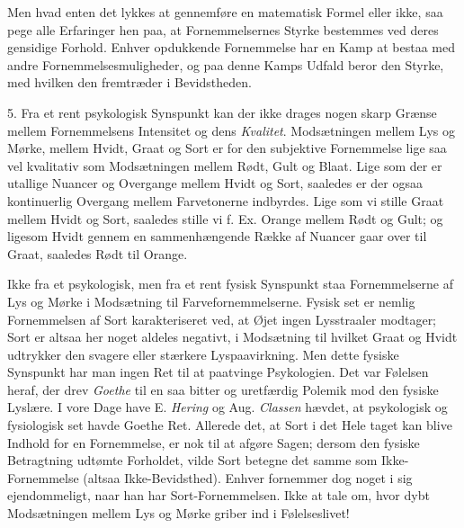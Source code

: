 \documentclass[12pt,a4paper,openany]{book}
\newcommand{\opage}[1]{\marginnote{\footnotesize\textit{[#1]}}}
\begin{document}
Men hvad enten det lykkes at gennemføre en matematisk Formel eller ikke,
saa pege alle Erfaringer hen paa, at Fornemmelsernes Styrke bestemmes
ved deres gensidige Forhold. Enhver opdukkende Fornemmelse har en Kamp
at bestaa med andre Fornemmelsesmuligheder, og paa denne Kamps Udfald
beror den Styrke, med hvilken den fremtræder i Bevidstheden.

5. Fra et rent psykologisk Synspunkt kan der ikke drages nogen skarp
Grænse mellem Fornemmelsens Intensitet og dens \emph{Kvalitet}.
Modsætningen mellem Lys og Mørke, mellem Hvidt, Graat og Sort er for den
subjektive Fornemmelse lige saa vel kvalitativ som Modsætningen mellem
Rødt, Gult og Blaat. Lige som der er utallige Nuancer og Overgange
mellem Hvidt og Sort, saaledes er der ogsaa kontinuerlig Overgang mellem
Farvetonerne indbyrdes. Lige som vi stille Graat mellem Hvidt og Sort,
saaledes stille vi f. Ex. Orange mellem Rødt og Gult; og ligesom Hvidt
gennem en sammenhængende Række af Nuancer gaar over til Graat, saaledes
Rødt til Orange.


\opage{135}Ikke fra et psykologisk, men fra et rent fysisk Synspunkt
staa Fornemmelserne af Lys og Mørke i Modsætning til
Farvefornemmelserne. Fysisk set er nemlig Fornemmelsen af Sort
karakteriseret ved, at Øjet ingen Lysstraaler modtager; Sort er altsaa
her noget aldeles negativt, i Modsætning til hvilket Graat og Hvidt
udtrykker den svagere eller stærkere Lyspaavirkning. Men dette fysiske
Synspunkt har man ingen Ret til at paatvinge Psykologien. Det var
Følelsen heraf, der drev \emph{Goethe} til en saa bitter og uretfærdig
Polemik mod den fysiske Lyslære. I vore Dage have E. \emph{Hering} og
Aug. \emph{Classen} hævdet, at psykologisk og fysiologisk set havde
Goethe Ret. Allerede det, at Sort i det Hele taget kan blive Indhold for
en Fornemmelse, er nok til at afgøre Sagen; dersom den fysiske
Betragtning udtømte Forholdet, vilde Sort betegne det samme som
Ikke-Fornemmelse (altsaa Ikke-Bevidsthed). Enhver fornemmer dog noget i
sig ejendommeligt, naar han har Sort-Fornemmelsen. Ikke at tale om, hvor
dybt Modsætningen mellem Lys og Mørke griber ind i Følelseslivet!
\end{document}
